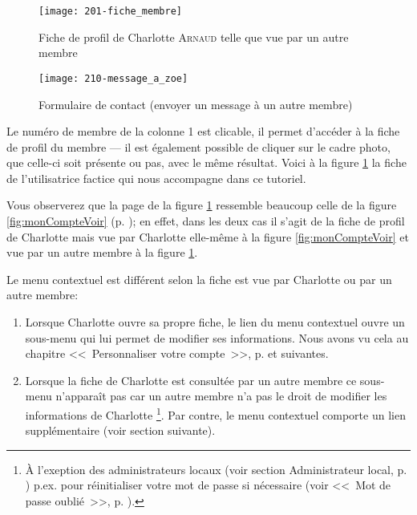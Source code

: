\label{sec:ficheProfil}

\begin{figure}
    \centering
    \texttt{[image: 201-fiche\_membre]}
    \caption[Fiche de profil de Charlotte \textsc{Arnaud}]{Fiche de profil de Charlotte \textsc{Arnaud} telle que vue par un autre membre}
    \label{fig:ficheMembre}
\end{figure}
\begin{figure}
    \centering
    \texttt{[image: 210-message\_a\_zoe]}
    \caption[Formulaire de contact]{Formulaire de contact (envoyer un message à un autre membre)}
    \label{fig:envoiMessage}
\end{figure}
Le numéro de membre de la colonne 1 est clicable, il permet d’accéder à la fiche de profil du membre --- il est également possible de cliquer sur le cadre photo, que celle-ci soit présente ou pas, avec le même résultat. Voici à la figure \ref{fig:ficheMembre} la fiche de l'utilisatrice factice qui nous accompagne dans ce tutoriel.

Vous observerez que la page de la figure \ref{fig:ficheMembre} ressemble beaucoup celle de la figure \ref{fig:monCompteVoir} (p. \pageref{fig:monCompteVoir}); en effet, dans les deux cas il s'agit de la fiche de profil de Charlotte mais vue par Charlotte elle-même à la figure \ref{fig:monCompteVoir} et vue par un autre membre à la figure \ref{fig:ficheMembre}.

Le menu contextuel est différent selon la fiche est vue par Charlotte ou par un autre membre:
\begin{enumerate}
    \item Lorsque Charlotte ouvre sa propre fiche, le lien  du menu contextuel ouvre un sous-menu qui lui permet de modifier ses informations. Nous avons vu cela au chapitre <<~Personnaliser votre compte~>>, p. \pageref{chap:personnaliserCompte} et suivantes.
    \item Lorsque la fiche de Charlotte est consultée par un autre membre ce sous-menu n'apparaît pas car un autre membre n'a pas le droit de modifier les informations de Charlotte%
    \footnote{À l'exeption des administrateurs locaux (voir section \og{}Administrateur local\fg{}, p. \pageref{sec:adminLocal}) p.ex. pour réinitialiser votre mot de passe si nécessaire (voir <<~Mot de passe oublié~>>, p. \pageref{sec:mdpOublie}).}.
    Par contre, le menu contextuel comporte un lien  supplémentaire (voir section suivante).
\end{enumerate}

